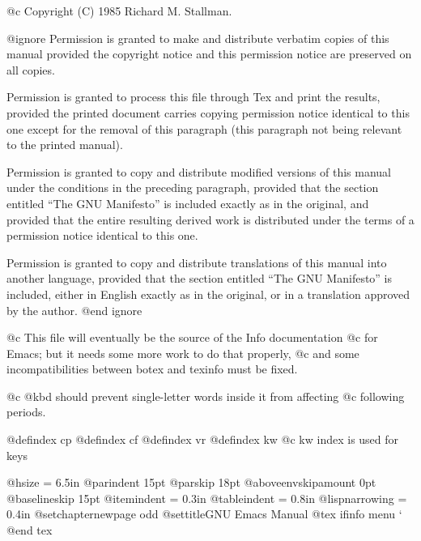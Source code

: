 

@c Copyright (C) 1985 Richard M. Stallman.

@ignore
Permission is granted to make and distribute verbatim copies of
this manual provided the copyright notice and this permission notice
are preserved on all copies.

Permission is granted to process this file through Tex and print the
results, provided the printed document carries copying permission
notice identical to this one except for the removal of this paragraph
(this paragraph not being relevant to the printed manual).

Permission is granted to copy and distribute modified versions of
this manual under the conditions in the preceding paragraph,
provided that the section entitled ``The GNU Manifesto''
is included exactly as in the original, and provided that
the entire resulting derived work is distributed under the terms of
a permission notice identical to this one.

Permission is granted to copy and distribute translations of this manual
into another language, provided that the section entitled ``The GNU
Manifesto'' is included, either in English exactly
as in the original, or in a translation approved by the author.
@end ignore

@c This file will eventually be the source of the Info documentation
@c for Emacs; but it needs some more work to do that properly,
@c and some incompatibilities between botex and texinfo must be fixed. 

@c @kbd should prevent single-letter words inside it from affecting
@c following periods.

@defindex cp
@defindex cf
@defindex vr
@defindex kw
@c kw index is used for keys

@hsize = 6.5in
@parindent 15pt
@parskip 18pt
@aboveenvskipamount 0pt
@baselineskip 15pt
@itemindent = 0.3in
@tableindent = 0.8in
@lispnarrowing = 0.4in
@setchapternewpage odd
@settitle{GNU Emacs Manual}
@tex
\gdef\iftex{}
\gdef\Eiftex{}
\long\gdef\ifinfo #1\end ifinfo{}
\long\gdef\menu #1\end menu{}
\gdef\var{\parsearg\iF}
\gdef\dfn{\parsearg\iF}
\gdef\ctl{\parsearg\ctlX}
\gdef\ctlX #1{{\tt \hat}#1}
\gdef\code{\parsearg\codeX}
\gdef\codeX #1{{\li #1}}
\gdef\kbd{\parsearg\kbdF}
\gdef\ttfont{\parsearg\kbdF}
\gdef\kbdF #1{{\tt #1}}
\gdef\samp{\parsearg\sampF}
\gdef\sampF #1{`{\tt #1}'}
\gdef\key{\parsearg\termkeyX}
\gdef\termkeyX #1{{\tt \uppercase{#1}}}
\gdef\node [#1]{}
\gdef\refill {}
\gdef\dots{$\ldots$}
\gdef\pxref [#1]{see \xrefX [#1,,,,,]}
\gdef\xref [#1]{See \xrefX [#1,,,,,]}
\gdef\xrefX [#1,#2,#3,#4]{\refx{#1-snt} [%
{\setbox0=\hbox{#3}%
\ifdim \wd0 =0pt #1\else\unhbox0\fi}%
], page\tie \refx{#1-pg}}
\gdef\setref{\parsearg\setrefX}
{\catcode `
\gdef\setrefX#1{%
\dosetq{#1-pg}{page-number}%
\dosetq{#1-snt}{section-number-and-type}}}
@end tex

